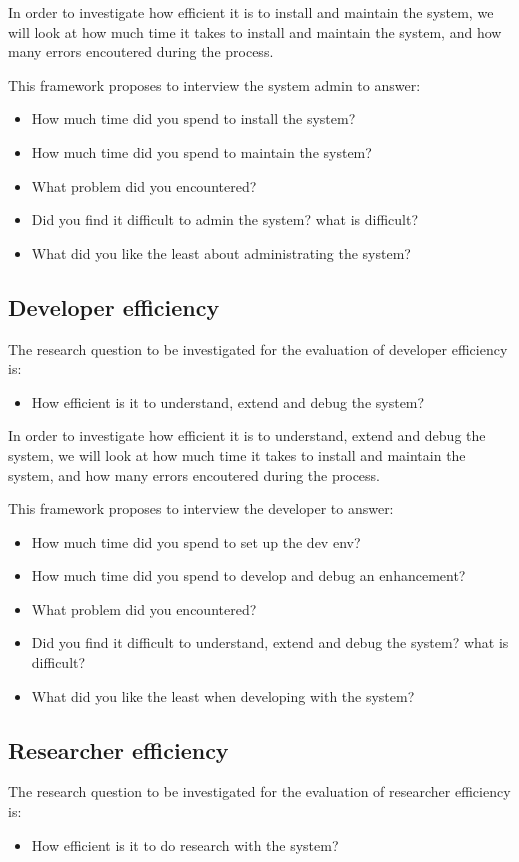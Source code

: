 In order to investigate how efficient it is to install and maintain the system, we will look at how much time it takes to install and maintain the system, and how many errors encoutered during the process.

This framework proposes to interview the system admin to answer:
\begin{itemize}
\item How much time did you spend to install the system?
\item How much time did you spend to maintain the system?
\item What problem did you encountered?
\item Did you find it difficult to admin the system? what is difficult?
\item What did you like the least about administrating the system?
\end{itemize}

\subsection{Developer efficiency}
The research question to be investigated for the evaluation of developer efficiency is:
\begin{itemize}
\item How efficient is it to understand, extend and debug the system?
\end{itemize}

In order to investigate how efficient it is to understand, extend and debug the system, we will look at how much time it takes to install and maintain the system, and how many errors encoutered during the process.

This framework proposes to interview the developer to answer:
\begin{itemize}
\item How much time did you spend to set up the dev env?
\item How much time did you spend to develop and debug an enhancement?
\item What problem did you encountered?
\item Did you find it difficult to understand, extend and debug the system? what is difficult?
\item What did you like the least when developing with the system?
\end{itemize}

\subsection{Researcher efficiency}
The research question to be investigated for the evaluation of researcher efficiency is:
\begin{itemize}
\item How efficient is it to do research with the system?
\end{itemize}

